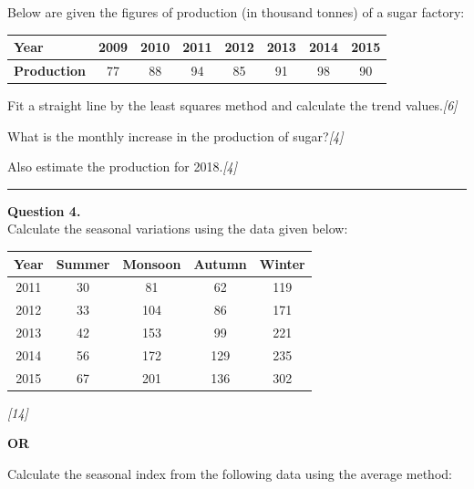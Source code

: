 \documentclass[11pt,a4paper]{article}
\newcommand{\pts}[1]{\hfill   \textit{[#1]}}
\begin{document}
Below are given the figures of production (in thousand tonnes) of a sugar factory:


\begin{center}
\small

\begin{tabular}{|l|c|c|c|c|c|c|c|}
\hline
   \textbf{Year} & 2009 & 2010 & 2011 & 2012 & 2013 & 2014 & 2015 \\
\hline
   \textbf{Production} & 77 & 88 & 94 & 85 & 91 & 98 & 90 \\
\hline
\end{tabular}
\end{center}


\begin{parts}
  \item Fit a straight line by the least squares method and calculate the trend values.\pts{6}
  \item What is the monthly increase in the production of sugar?\pts{4}
  \item Also estimate the production for 2018.\pts{4}
\end{parts}

\medskip\rule{\linewidth}{0.2pt}




\noindent   \textbf{Question 4.} \\
Calculate the seasonal variations using the data given below:


\begin{center}
\small

\begin{tabular}{|c|c|c|c|c|}
\hline
   \textbf{Year} &   \textbf{Summer} &   \textbf{Monsoon} &   \textbf{Autumn} &   \textbf{Winter} \\
\hline
2011 & 30 & 81 & 62 & 119 \\
2012 & 33 & 104 & 86 & 171 \\
2013 & 42 & 153 & 99 & 221 \\
2014 & 56 & 172 & 129 & 235 \\
2015 & 67 & 201 & 136 & 302 \\
\hline
\end{tabular}
\end{center}\pts{14}

\centerline{   \textbf{OR}}

Calculate the seasonal index from the following data using the average method:
\end{document}
